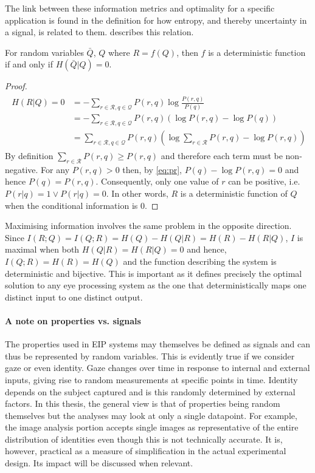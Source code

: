 The link between these information metrics and optimality for a specific application is found in the definition for how entropy, and thereby uncertainty in a signal, is related to them.  describes this relation.

\begin{theorem}
    For random variables $\bar{Q}$, $Q$ where $R=f(Q)$, then $f$ is a deterministic function if and only if $H(\bar{Q}|Q)=0$.
\end{theorem}

\begin{proof}

\begin{align}\label{eq:pr}
\begin{aligned}
    H(R|Q) = 0 &=-\sum_{r\in\mathcal{R}, q\in\mathcal{Q}} P(r,q)\log\frac{P(r,q)}{P(q)}\\
    &= -\sum_{r\in\mathcal{R}, q\in\mathcal{Q}} P(r,q)\left(\log P(r,q) - \log P(q)\right)\\
    &= \sum_{r\in\mathcal{R}, q\in\mathcal{Q}} P(r, q)\left(\log \sum_{r\in\mathcal{R}} P(r, q) - \log P(r,q)\right)
\end{aligned}
\end{align}
By definition $\sum_{r\in\mathcal{R}} P(r, q) \geq P(r,q)$ and therefore each term must be non-negative. For any $P(r,q) > 0$ then, by \cref{eq:pr}, $P(q) - \log P(r,q) = 0$ and hence $P(q) = P(r,q)$. Consequently, only one value of $r$ can be positive, i.e. $P(r|q) = 1 \vee P(r|q) = 0$. In other words, $R$ is a deterministic function of $Q$ when the conditional information is $0$. 
\end{proof}

Maximising information involves the same problem in the opposite direction. Since $I(R;Q) = I(Q; R) = H(Q) - H(Q|R) = H(R) - H(R|Q)$, $I$ is maximal when both $H(Q|R)=H(R|Q)=0$ and hence, $I(Q;R)=H(R)=H(Q)$ and the function describing the system is deterministic and bijective. This is important as it defines precisely the optimal solution to any eye processing system as the one that deterministically maps one distinct input to one distinct output.

\paragraph{A note on properties vs. signals}
The properties used in EIP systems may themselves be defined as signals and can thus be represented by random variables. This is evidently true if we consider gaze or even identity. Gaze changes over time in response to internal and external inputs, giving rise to random measurements at specific points in time. Identity depends on the subject captured and is this randomly determined by external factors. In this thesis, the general view is that of properties being random themselves but the analyses may look at only a single datapoint. For example, the image analysis portion accepts single images as representative of the entire distribution of identities even though this is not technically accurate. It is, however, practical as a measure of simplification in the actual experimental design. Its impact will be discussed when relevant.

